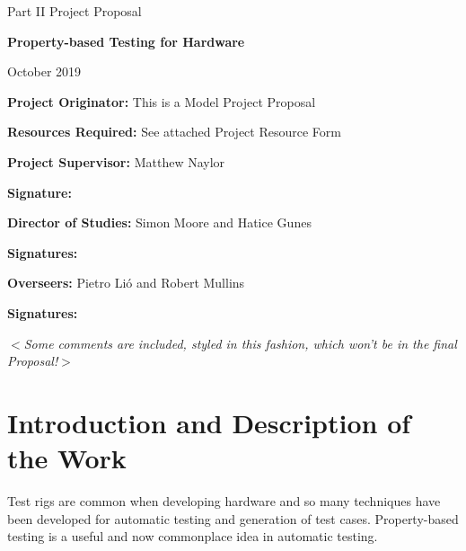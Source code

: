 \documentclass[UKenglish, 12pt]{article}
\newcommand{\al}{$<$}
\newcommand{\ar}{$>$}
\begin{document}
\thispagestyle{empty}

\medskip
{}
\medskip
{}

\vfil

\centerline{\large Part II Project Proposal}
\vspace{0.4in}
\centerline{\Large\bf Property-based Testing for Hardware}
\vspace{0.3in}
\centerline{\large{October 2019}}

\vfil

{\bf Project Originator:} This is a Model Project Proposal

\vspace{0.1in}

{\bf Resources Required:} See attached Project Resource Form

\vspace{0.5in}

{\bf Project Supervisor:} {Matthew Naylor}

\vspace{0.2in}

{\bf Signature:}

\vspace{0.5in}

{\bf Director of Studies:} {Simon Moore and Hatice Gunes}

\vspace{0.2in}

{\bf Signatures:}

\vspace{0.5in}

{\bf Overseers:} {Pietro Li\'o} and {Robert Mullins}

\vspace{0.2in}

{\bf Signatures:}

\vfil
\eject


\al\emph{Some comments are included, styled in this fashion, which
won't be in the final Proposal!}\ar

\section*{Introduction and Description of the Work}

Test rigs are common when developing hardware and so many techniques have
been developed for automatic testing and generation of test cases. Property-based
testing is a useful and now commonplace idea in automatic testing.
\end{document}
